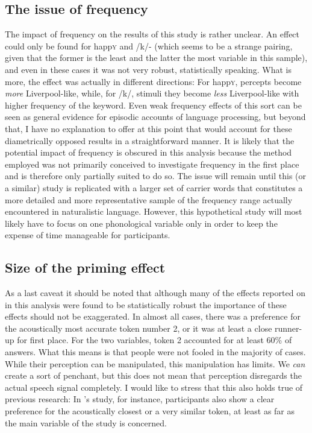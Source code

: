 		\subsection{The issue of frequency}

The impact of frequency on the results of this study is rather unclear.
An effect could only be found for happ\textsc{y} and /k/- (which seems to be a strange pairing, given that the former is the least and the latter the most  variable in this sample), and even in these cases it was not very robust, statistically speaking.
What is more, the effect was actually in different directions: For happ\textsc{y}, percepts become \emph{more} Liverpool-like, while, for /k/, stimuli they become \emph{less} Liverpool-like with higher frequency of the keyword.
Even weak frequency effects of this sort can be seen as general evidence for episodic accounts of language processing, but beyond that, I have no explanation to offer at this point that would account for these diametrically opposed results in a straightforward manner.
It is likely that the potential impact of frequency is obscured in this analysis because the method employed was not primarily conceived to investigate frequency in the first place and is therefore only partially suited to do so.
The issue will remain until this (or a similar) study is replicated with a larger set of carrier words that constitutes a more detailed and more representative sample of the frequency range actually encountered in naturalistic language.
However, this hypothetical study will most likely have to focus on one phonological variable only in order to keep the expense of time manageable for participants.

		\subsection{Size of the priming effect}

As a last caveat it should be noted that although many of the  effects reported on in this analysis were found to be statistically robust the importance of these effects should not be exaggerated.
In almost all cases, there was a preference for the acoustically most accurate token number 2, or it was at least a close runner-up for first place.
For the two  variables, token 2 accounted for at least 60\% of answers.
What this means is that people were not fooled in the majority of cases.
While their perception can be manipulated, this manipulation has limits.
We \emph{can} create a sort of penchant, but this does not mean that perception disregards the actual speech signal completely.
I would like to stress that this also holds true of previous research: In \textcite{haydrager2010}'s study, for instance, participants also show a clear preference for the acoustically closest or a very similar token, at least as far as the main variable of the study is concerned.

